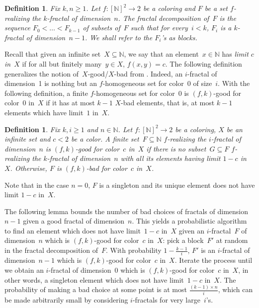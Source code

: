 \documentclass{article}
\numberwithin{theorem}{section}
\newtheorem{definition}[theorem]{Definition}
\newcommand{\NN}[0]{\mathbb{N}}
\begin{document}
\begin{definition}
Fix $k, n \geq 1$.
Let $f : [\NN]^2 \to 2$ be a coloring and $F$ be a set $f$-realizing the $k$-fractal of dimension~$n$.
The \emph{fractal decomposition} of~$F$ is the sequence $F_0 < \dots < F_{k-1}$ of subsets of~$F$
such that for every~$i < k$, $F_i$ is a $k$-fractal of dimension~$n-1$. We shall refer to the $F_i$'s as \emph{blocks}.
\end{definition}

Recall that given an infinite set~$X \subseteq \NN$, we say that an element~$x \in \NN$ has \emph{limit $c$ in~$X$} if for all but finitely many~$y \in X$, $f(x, y) = c$. The following definition generalizes the notion of~$X$-good/$X$-bad from . Indeed, an $i$-fractal of dimension~1 is nothing but an $f$-homogeneous set for color~0 of size~$i$. With the following definition, a finite $f$-homogeneous set for color~$0$ is $(f, k)$-good for color~$0$ in~$X$ if it has at most $k-1$ $X$-bad elements, that is, at most $k-1$ elements which have limit~$1$ in~$X$.

\begin{definition}
Fix $k, i \geq 1$ and $n \in \NN$.
Let $f : [\NN]^2 \to 2$ be a coloring, $X$ be an infinite set and $c < 2$ be a color.
A finite set~$F \subseteq \NN$ $f$-realizing the $i$-fractal of dimension~$n$ is \emph{$(f,k)$-good for color~$c$ in~$X$} if
there is no subset~$G \subseteq F$ $f$-realizing the $k$-fractal of dimension~$n$ with all its elements having limit $1-c$ in~$X$.
Otherwise, $F$ is \emph{$(f,k)$-bad for color~$c$ in~$X$}.
\end{definition}

Note that in the case $n = 0$, $F$ is a singleton and its unique element does not have limit $1-c$ in~$X$.

The following lemma bounds the number of bad choices of fractals of dimension~$n-1$ given a good fractal of dimension~$n$. This yields a probabilistic algorithm to find an element which does not have limit~$1-c$ in~$X$ given an $i$-fractal~$F$ of dimension~$n$ which is $(f, k)$-good for color~$c$ in~$X$: pick a block~$F'$ at random in the fractal decomposition of~$F$. With probability $1-\frac{k-1}{i}$, $F'$ is an $i$-fractal of dimension~$n-1$ which is $(f, k)$-good for color~$c$ in~$X$. Iterate the process until we obtain an $i$-fractal of dimension~0 which is $(f,k)$-good for color~$c$ in~$X$, in other words, a singleton element which does not have limit~$1-c$ in~$X$. The probability of making a bad choice at some point is at most $\frac{(k-1) \times n}{i}$, which can be made arbitrarily small by considering $i$-fractals for very large~$i$'s.
\end{document}
